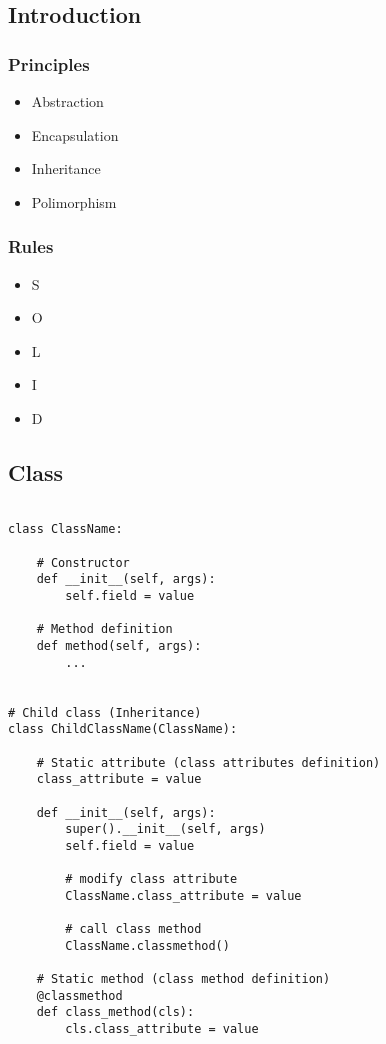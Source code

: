 \subsection{Introduction}

\subsubsection{Principles}

    \begin{itemize}
        \item Abstraction
        \item Encapsulation
        \item Inheritance
        \item Polimorphism
    \end{itemize}


\subsubsection{Rules}

    \begin{itemize}
        \item S
        \item O
        \item L
        \item I
        \item D
    \end{itemize}




\subsection{Class}

\begin{verbatim}

class ClassName:

    # Constructor
    def __init__(self, args):
        self.field = value

    # Method definition
    def method(self, args):
        ...


# Child class (Inheritance)
class ChildClassName(ClassName):

    # Static attribute (class attributes definition)
    class_attribute = value

    def __init__(self, args):
        super().__init__(self, args)
        self.field = value

        # modify class attribute
        ClassName.class_attribute = value

        # call class method
        ClassName.classmethod()

    # Static method (class method definition)
    @classmethod
    def class_method(cls):
        cls.class_attribute = value

\end{verbatim}


